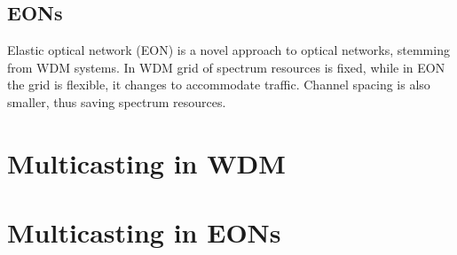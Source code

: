 \documentclass[conference]{IEEEtran}
\begin{document}
\subsection{EONs}
Elastic optical network (EON) is a novel approach to optical networks, stemming from WDM systems. In WDM grid of spectrum resources is fixed, while in EON the grid is flexible, it changes to accommodate traffic. Channel spacing is also smaller, thus saving spectrum resources.

\section{Multicasting in WDM}

\section{Multicasting in EONs}

\begin{thebibliography}{00}
\end{thebibliography}
\end{document}
